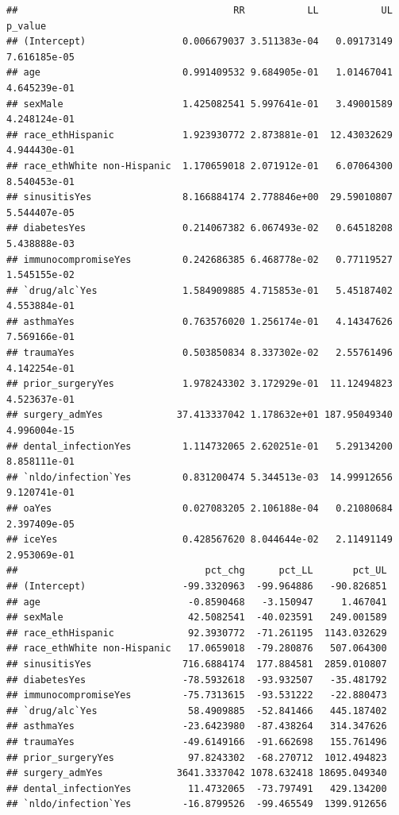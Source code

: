 \documentclass[
]{article}
\begin{document}
\begin{verbatim}
##                                      RR           LL           UL      p_value
## (Intercept)                 0.006679037 3.511383e-04   0.09173149 7.616185e-05
## age                         0.991409532 9.684905e-01   1.01467041 4.645239e-01
## sexMale                     1.425082541 5.997641e-01   3.49001589 4.248124e-01
## race_ethHispanic            1.923930772 2.873881e-01  12.43032629 4.944430e-01
## race_ethWhite non-Hispanic  1.170659018 2.071912e-01   6.07064300 8.540453e-01
## sinusitisYes                8.166884174 2.778846e+00  29.59010807 5.544407e-05
## diabetesYes                 0.214067382 6.067493e-02   0.64518208 5.438888e-03
## immunocompromiseYes         0.242686385 6.468778e-02   0.77119527 1.545155e-02
## `drug/alc`Yes               1.584909885 4.715853e-01   5.45187402 4.553884e-01
## asthmaYes                   0.763576020 1.256174e-01   4.14347626 7.569166e-01
## traumaYes                   0.503850834 8.337302e-02   2.55761496 4.142254e-01
## prior_surgeryYes            1.978243302 3.172929e-01  11.12494823 4.523637e-01
## surgery_admYes             37.413337042 1.178632e+01 187.95049340 4.996004e-15
## dental_infectionYes         1.114732065 2.620251e-01   5.29134200 8.858111e-01
## `nldo/infection`Yes         0.831200474 5.344513e-03  14.99912656 9.120741e-01
## oaYes                       0.027083205 2.106188e-04   0.21080684 2.397409e-05
## iceYes                      0.428567620 8.044644e-02   2.11491149 2.953069e-01
##                                 pct_chg      pct_LL       pct_UL
## (Intercept)                 -99.3320963  -99.964886   -90.826851
## age                          -0.8590468   -3.150947     1.467041
## sexMale                      42.5082541  -40.023591   249.001589
## race_ethHispanic             92.3930772  -71.261195  1143.032629
## race_ethWhite non-Hispanic   17.0659018  -79.280876   507.064300
## sinusitisYes                716.6884174  177.884581  2859.010807
## diabetesYes                 -78.5932618  -93.932507   -35.481792
## immunocompromiseYes         -75.7313615  -93.531222   -22.880473
## `drug/alc`Yes                58.4909885  -52.841466   445.187402
## asthmaYes                   -23.6423980  -87.438264   314.347626
## traumaYes                   -49.6149166  -91.662698   155.761496
## prior_surgeryYes             97.8243302  -68.270712  1012.494823
## surgery_admYes             3641.3337042 1078.632418 18695.049340
## dental_infectionYes          11.4732065  -73.797491   429.134200
## `nldo/infection`Yes         -16.8799526  -99.465549  1399.912656

\end{verbatim}
\end{document}

